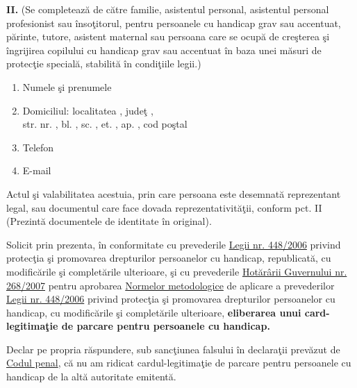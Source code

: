 \documentclass[10pt,a4paper]{article}
\newcommand{\fillline}[1][6cm]{\underline{\hspace{#1}}}
\begin{document}
\vspace{0.3cm}

\textbf{II.} (Se completează de către familie, asistentul personal, asistentul personal profesionist sau însoţitorul, pentru persoanele cu handicap grav sau accentuat, părinte, tutore, asistent maternal sau persoana care se ocupă de creşterea şi îngrijirea copilului cu handicap grav sau accentuat în baza unei măsuri de protecţie specială, stabilită în condiţiile legii.)

\begin{enumerate}[leftmargin=1cm]
\item Numele şi prenumele \fillline[10cm]
\item Domiciliul: localitatea \fillline[5cm], judeţ \fillline[4cm],\\
str. \fillline[6cm] nr. \fillline[1cm], bl. \fillline[1cm], sc. \fillline[1cm], et. \fillline[1cm], ap. \fillline[1cm], cod poştal \fillline[2cm]
\item Telefon \fillline[6cm]
\item E-mail \fillline[6cm]
\end{enumerate}

\vspace{0.2cm}

\hspace{0.5cm}Actul şi valabilitatea acestuia, prin care persoana este desemnată reprezentant legal, sau documentul care face dovada reprezentativităţii, conform pct. II \fillline[6cm] (Prezintă documentele de identitate în original).

\vspace{0.3cm}

\hspace{0.5cm}Solicit prin prezenta, în conformitate cu prevederile \underline{Legii nr. 448/2006} privind protecţia şi promovarea drepturilor persoanelor cu handicap, republicată, cu modificările şi completările ulterioare, şi cu prevederile \underline{Hotărârii Guvernului nr. 268/2007} pentru aprobarea \underline{Normelor metodologice} de aplicare a prevederilor \underline{Legii nr. 448/2006} privind protecţia şi promovarea drepturilor persoanelor cu handicap, cu modificările şi completările ulterioare, \textbf{eliberarea unui card-legitimaţie de parcare pentru persoanele cu handicap.}

\vspace{0.3cm}

\hspace{0.5cm}Declar pe propria răspundere, sub sancţiunea falsului în declaraţii prevăzut de \underline{Codul penal}, că nu am ridicat cardul-legitimaţie de parcare pentru persoanele cu handicap de la altă autoritate emitentă.
\end{document}

